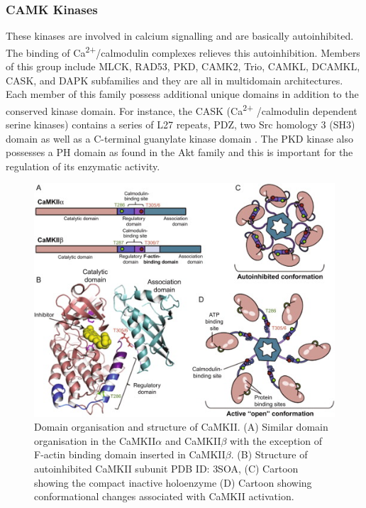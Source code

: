 \documentclass[a4paper, 11pt]{article}
\begin{document}
\subsubsection*{CAMK Kinases}
These kinases are involved in calcium signalling and are basically autoinhibited. The binding of Ca\textsuperscript{2+}/calmodulin complexes relieves this autoinhibition. Members of this group include MLCK, RAD53, PKD, CAMK2, Trio, CAMKL, DCAMKL, CASK, and DAPK subfamilies and they are all in multidomain architectures. Each member of this family possess additional unique domains in addition to the conserved kinase domain. For instance, the CASK (Ca\textsuperscript{2+} /calmodulin dependent serine kinases) contains a series of L27 repeats, PDZ, two Src homology 3 (SH3) domain as well as a C-terminal guanylate kinase domain \cite{rakshambikai2015typical}. The PKD kinase also possesses a PH domain as found in the Akt family and this is important for the regulation of its enzymatic activity.\\
\begin{figure}[H]
	\includegraphics[width=.8\linewidth]{figures/camk_kinase.jpg}
	\centering
	\caption{Domain organisation and structure of CaMKII. (A) Similar domain organisation in the CaMKII$\alpha$ and CaMKII$\beta$ with the exception of F-actin binding domain inserted in CaMKII$\beta$. (B) Structure of autoinhibited CaMKII subunit PDB ID: 3SOA, (C) Cartoon showing the compact inactive holoenzyme (D) Cartoon showing conformational changes associated with CaMKII activation.}
	\label{camk_kinase}
\end{figure}
\end{document}
